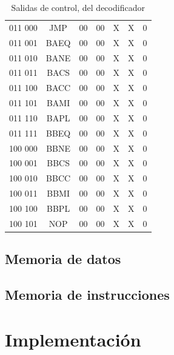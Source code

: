 \documentclass[paper=letter, fontsize=12pt]{article}
\begin{document}
\begin{table}
\begin{tabular}{cc|ccccc}
011 000 	& JMP			& 00 	& 00    & X     & X     & 0 \\
011 001 	& BAEQ			& 00 	& 00    & X     & X     & 0 \\
011 010 	& BANE			& 00 	& 00    & X     & X     & 0 \\
011 011 	& BACS			& 00 	& 00    & X     & X     & 0 \\
011 100 	& BACC			& 00 	& 00    & X     & X     & 0 \\
011 101 	& BAMI			& 00 	& 00    & X     & X     & 0 \\
011 110 	& BAPL			& 00 	& 00    & X     & X     & 0 \\
011 111 	& BBEQ			& 00 	& 00    & X     & X     & 0 \\
100 000 	& BBNE			& 00 	& 00    & X     & X     & 0 \\
100 001 	& BBCS			& 00 	& 00    & X     & X     & 0 \\
100 010 	& BBCC			& 00 	& 00    & X     & X     & 0 \\
100 011 	& BBMI			& 00 	& 00    & X     & X     & 0 \\
100 100 	& BBPL			& 00 	& 00    & X     & X     & 0 \\

100 101 	& NOP			& 00 	& 00    & X     & X     & 0 \\

\end{tabular}
\caption{Salidas de control, del decodificador}
\label{tablaDecodificacion}
\end{table}


\subsection{Memoria de datos}

\subsection{Memoria de instrucciones}

\section{Implementación}
\end{document}
